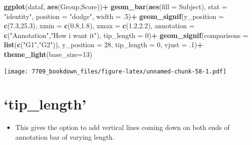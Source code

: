 \documentclass[]{book}
\newenvironment{Shaded}{\begin{snugshade}}{\end{snugshade}}
\newcommand{\DataTypeTok}[1]{\textcolor[rgb]{0.13,0.29,0.53}{#1}}
\newcommand{\DecValTok}[1]{\textcolor[rgb]{0.00,0.00,0.81}{#1}}
\newcommand{\FloatTok}[1]{\textcolor[rgb]{0.00,0.00,0.81}{#1}}
\newcommand{\KeywordTok}[1]{\textcolor[rgb]{0.13,0.29,0.53}{\textbf{#1}}}
\newcommand{\NormalTok}[1]{#1}
\newcommand{\OperatorTok}[1]{\textcolor[rgb]{0.81,0.36,0.00}{\textbf{#1}}}
\newcommand{\StringTok}[1]{\textcolor[rgb]{0.31,0.60,0.02}{#1}}
\providecommand{\tightlist}{%
  \setlength{\itemsep}{0pt}\setlength{\parskip}{0pt}}
\begin{document}
\begin{Shaded}
\begin{Highlighting}[]
\KeywordTok{ggplot}\NormalTok{(dataf, }\KeywordTok{aes}\NormalTok{(Group,Score))}\OperatorTok{+}
\StringTok{  }\KeywordTok{geom_bar}\NormalTok{(}\KeywordTok{aes}\NormalTok{(}\DataTypeTok{fill =}\NormalTok{ Subject), }\DataTypeTok{stat =} \StringTok{"identity"}\NormalTok{, }
           \DataTypeTok{position =} \StringTok{"dodge"}\NormalTok{, }\DataTypeTok{width =} \FloatTok{.5}\NormalTok{)}\OperatorTok{+}
\StringTok{  }\KeywordTok{geom_signif}\NormalTok{(}\DataTypeTok{y_position =} \KeywordTok{c}\NormalTok{(}\FloatTok{7.3}\NormalTok{,}\FloatTok{25.3}\NormalTok{), }\DataTypeTok{xmin =} \KeywordTok{c}\NormalTok{(}\FloatTok{0.8}\NormalTok{,}\FloatTok{1.8}\NormalTok{), }
              \DataTypeTok{xmax =} \KeywordTok{c}\NormalTok{(}\FloatTok{1.2}\NormalTok{,}\FloatTok{2.2}\NormalTok{), }\DataTypeTok{annotation =} \KeywordTok{c}\NormalTok{(}\StringTok{"Annotation"}\NormalTok{,}\StringTok{"How i want it"}\NormalTok{),}
              \DataTypeTok{tip_length =} \DecValTok{0}\NormalTok{)}\OperatorTok{+}
\StringTok{  }\KeywordTok{geom_signif}\NormalTok{(}\DataTypeTok{comparisons =} \KeywordTok{list}\NormalTok{(}\KeywordTok{c}\NormalTok{(}\StringTok{"G1"}\NormalTok{,}\StringTok{"G2"}\NormalTok{)), }\DataTypeTok{y_position =} \DecValTok{28}\NormalTok{,}
              \DataTypeTok{tip_length =} \DecValTok{0}\NormalTok{, }\DataTypeTok{vjust =} \FloatTok{.1}\NormalTok{)}\OperatorTok{+}
\StringTok{  }\KeywordTok{theme_light}\NormalTok{(}\DataTypeTok{base_size=}\DecValTok{13}\NormalTok{)}
\end{Highlighting}
\end{Shaded}

\texttt{[image: 7709\_bookdown\_files/figure-latex/unnamed-chunk-58-1.pdf]}

\hypertarget{tip_length}{%
\section{`tip\_length'}\label{tip_length}}

\begin{itemize}
\tightlist
\item
  This gives the option to add vertical lines coming down on both ends of annotation bar of varying length.
\end{itemize}
\end{document}
